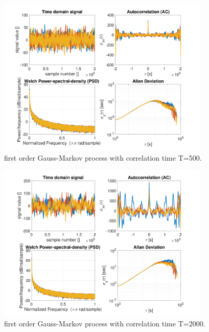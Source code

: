 \documentclass{article}
\begin{document}
\begin{figure}[H]
    \centering
    \includegraphics[width=0.9\textwidth]{gm500}
    \caption{first order Gauss-Markov process with correlation time T=500.}
    \label{fig:gm500}
\end{figure}

\begin{figure}[H]
    \centering
    \includegraphics[width=0.9\textwidth]{gm2000}
    \caption{first order Gauss-Markov process with correlation time T=2000.}
    \label{fig:gm2000}
\end{figure}
\end{document}
